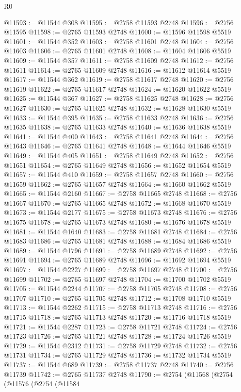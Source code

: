 \begin{lexlean}{R0}
\begin{coremodule}
@11593 := @11544 @308
@11595 := @2758 @11593 @2748
@11596 := @2756 @11595
@11598 := @2765 @11593 @2748
@11600 := @11596 @11598 @5519
@11601 := @11544 @352
@11603 := @2758 @11601 @2748
@11604 := @2756 @11603
@11606 := @2765 @11601 @2748
@11608 := @11604 @11606 @5519
@11609 := @11544 @357
@11611 := @2758 @11609 @2748
@11612 := @2756 @11611
@11614 := @2765 @11609 @2748
@11616 := @11612 @11614 @5519
@11617 := @11544 @362
@11619 := @2758 @11617 @2748
@11620 := @2756 @11619
@11622 := @2765 @11617 @2748
@11624 := @11620 @11622 @5519
@11625 := @11544 @367
@11627 := @2758 @11625 @2748
@11628 := @2756 @11627
@11630 := @2765 @11625 @2748
@11632 := @11628 @11630 @5519
@11633 := @11544 @395
@11635 := @2758 @11633 @2748
@11636 := @2756 @11635
@11638 := @2765 @11633 @2748
@11640 := @11636 @11638 @5519
@11641 := @11544 @400
@11643 := @2758 @11641 @2748
@11644 := @2756 @11643
@11646 := @2765 @11641 @2748
@11648 := @11644 @11646 @5519
@11649 := @11544 @405
@11651 := @2758 @11649 @2748
@11652 := @2756 @11651
@11654 := @2765 @11649 @2748
@11656 := @11652 @11654 @5519
@11657 := @11544 @410
@11659 := @2758 @11657 @2748
@11660 := @2756 @11659
@11662 := @2765 @11657 @2748
@11664 := @11660 @11662 @5519
@11665 := @11544 @2160
@11667 := @2758 @11665 @2748
@11668 := @2756 @11667
@11670 := @2765 @11665 @2748
@11672 := @11668 @11670 @5519
@11673 := @11544 @2177
@11675 := @2758 @11673 @2748
@11676 := @2756 @11675
@11678 := @2765 @11673 @2748
@11680 := @11676 @11678 @5519
@11681 := @11544 @1640
@11683 := @2758 @11681 @2748
@11684 := @2756 @11683
@11686 := @2765 @11681 @2748
@11688 := @11684 @11686 @5519
@11689 := @11544 @1796
@11691 := @2758 @11689 @2748
@11692 := @2756 @11691
@11694 := @2765 @11689 @2748
@11696 := @11692 @11694 @5519
@11697 := @11544 @2227
@11699 := @2758 @11697 @2748
@11700 := @2756 @11699
@11702 := @2765 @11697 @2748
@11704 := @11700 @11702 @5519
@11705 := @11544 @2244
@11707 := @2758 @11705 @2748
@11708 := @2756 @11707
@11710 := @2765 @11705 @2748
@11712 := @11708 @11710 @5519
@11713 := @11544 @2262
@11715 := @2758 @11713 @2748
@11716 := @2756 @11715
@11718 := @2765 @11713 @2748
@11720 := @11716 @11718 @5519
@11721 := @11544 @2287
@11723 := @2758 @11721 @2748
@11724 := @2756 @11723
@11726 := @2765 @11721 @2748
@11728 := @11724 @11726 @5519
@11729 := @11544 @2312
@11731 := @2758 @11729 @2748
@11732 := @2756 @11731
@11734 := @2765 @11729 @2748
@11736 := @11732 @11734 @5519
@11737 := @11544 @689
@11739 := @2758 @11737 @2748
@11740 := @2756 @11739
@11742 := @2765 @11737 @2748
@11790 := @2754
    (@11568
      (@2754
        (@11576
          (@2754
            (@11584

\end{coremodule}
\end{lexlean}
